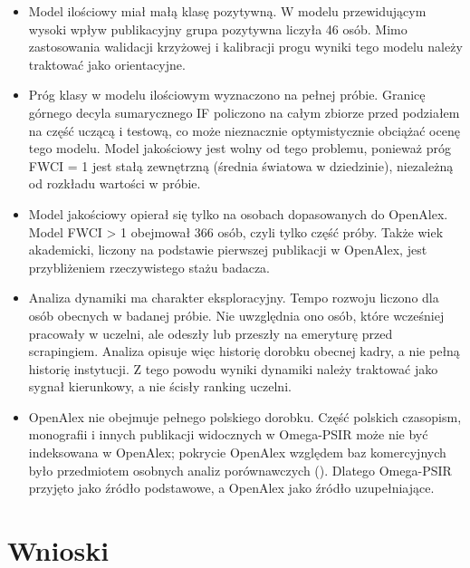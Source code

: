 \documentclass[
  polish,
  12pt,
  a4paper,
]{article}
\begin{document}
\begin{itemize}
  h-index, liczba publikacji i sumaryczny IF rosną wraz ze stażem,
  dlatego część różnic między stanowiskami może wynikać po prostu z
  długości kariery naukowej.
\item
  Model ilościowy miał małą klasę pozytywną. W modelu przewidującym
  wysoki wpływ publikacyjny grupa pozytywna liczyła 46 osób. Mimo
  zastosowania walidacji krzyżowej i kalibracji progu wyniki tego modelu
  należy traktować jako orientacyjne.
\item
  Próg klasy w modelu ilościowym wyznaczono na pełnej próbie. Granicę
  górnego decyla sumarycznego IF policzono na całym zbiorze przed
  podziałem na część uczącą i testową, co może nieznacznie
  optymistycznie obciążać ocenę tego modelu. Model jakościowy jest wolny
  od tego problemu, ponieważ próg FWCI = 1 jest stałą zewnętrzną
  (średnia światowa w dziedzinie), niezależną od rozkładu wartości w
  próbie.
\item
  Model jakościowy opierał się tylko na osobach dopasowanych do
  OpenAlex. Model FWCI \textgreater{} 1 obejmował 366 osób, czyli tylko
  część próby. Także wiek akademicki, liczony na podstawie pierwszej
  publikacji w OpenAlex, jest przybliżeniem rzeczywistego stażu badacza.
\item
  Analiza dynamiki ma charakter eksploracyjny. Tempo rozwoju liczono dla
  osób obecnych w badanej próbie. Nie uwzględnia ono osób, które
  wcześniej pracowały w uczelni, ale odeszły lub przeszły na emeryturę
  przed scrapingiem. Analiza opisuje więc historię dorobku obecnej
  kadry, a nie pełną historię instytucji. Z tego powodu wyniki dynamiki
  należy traktować jako sygnał kierunkowy, a nie ścisły ranking uczelni.
\item
  OpenAlex nie obejmuje pełnego polskiego dorobku. Część polskich
  czasopism, monografii i innych publikacji widocznych w Omega-PSIR może
  nie być indeksowana w OpenAlex; pokrycie OpenAlex względem baz
  komercyjnych było przedmiotem osobnych analiz porównawczych
  (). Dlatego Omega-PSIR przyjęto jako źródło podstawowe, a OpenAlex
  jako źródło uzupełniające.
\end{itemize}

\section{Wnioski}\label{wnioski}
\end{document}
